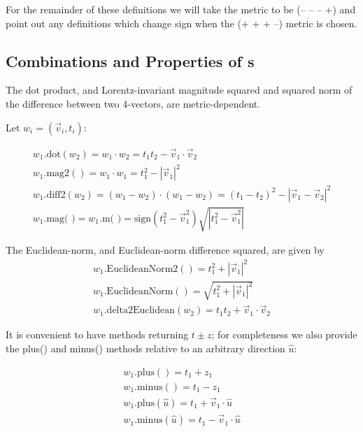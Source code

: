 For the remainder of these definitions we will take the metric to be
(-- -- -- +) and point out any definitions which change sign when the
(+ + + --) metric is chosen.


\subsection{Combinations and Properties of \protect\LV s}

The dot product, and Lorentz-invariant magnitude squared and
squared norm of the difference between two 4-vectors, are metric-dependent.

Let $w_i = ( \vec{v}_i, t_i )$:

\begin{eqnarray}
\label{eq:wdot:2}
  w_1\mbox{.dot}(w_2) = w_1 \cdot w_2 = t_1 t_2 - \vec{v}_1 \cdot \vec{v}_2 \\
\label{eq:wmag2}
  w_1\mbox{.mag2}() = w_1 \cdot w_1 = t_1^2 - |\vec{v}_1|^2 \\
\label{eq:wdiff2}
  w_1\mbox{.diff2}(w_2) = (w_1-w_2) \cdot (w_1-w_2) =
	(t_1 - t_2)^2 -   \left| \vec{v}_1 - \vec{v}_2 \right| ^2 \\
\label{eq:wmag}
w_1\mbox{.mag(~)} = w_1\mbox{.m(~)} = 
	\mbox{sign}(t_1^2 - \vec{v}_1^2) 
		\sqrt{\left|t_1^2 - \vec{v}_1^2\right|} 
\end{eqnarray}

The Euclidean-norm, and Euclidean-norm difference squared, are given by
\begin{eqnarray}
\label{eq:wENorm2}
  w_1\mbox{.EuclideanNorm2}() = t_1^2 + |\vec{v}_1|^2 \\
\label{eq:wENorm}
  w_1\mbox{.EuclideanNorm}() = \sqrt{t_1^2 + |\vec{v}_1|^2} \\
\label{eq:wdelta2E}
  w_1\mbox{.delta2Euclidean}(w_2) = t_1 t_2 + \vec{v}_1 \cdot \vec{v}_2
\end{eqnarray}

It is convenient to have methods returning $t \pm z$; for completeness
we also provide the plus() and minus() methods relative to an arbitrary
direction $\hat{u}$:

\begin{eqnarray}
\label{eq:wplus}
  w_1\mbox{.plus}() = t_1 + z_1 \\
\label{eq:wminus}
  w_1\mbox{.minus}() = t_1 - z_1 \\
\label{eq:wplus:2}
  w_1\mbox{.plus}(\hat{u}) = t_1 + \vec{v}_1 \cdot \hat{u} \\
\label{eq:wminus:2}
  w_1\mbox{.minus}(\hat{u}) = t_1 - \vec{v}_1 \cdot \hat{u}
\end{eqnarray}

